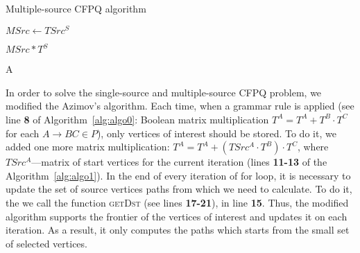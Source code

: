\begin{algorithm}
\small
\begin{algorithmic}[1]
\caption{Multiple-source CFPQ algorithm}
\label{alg:algo1}


     
    \EndFor
    
    \State $MSrc \gets TSrc^S$

     
        \EndFor
    \EndFor

     
        \EndFor
    \EndWhile
    \State \Return $MSrc * T^S$
\EndFunction



    \EndFor
    \State \Return A
\EndFunction
\end{algorithmic}
\end{algorithm}

In order to solve the single-source and multiple-source CFPQ problem, we modified the Azimov's algorithm.
Each time, when a grammar rule is applied (see line \textbf{8} of Algorithm~\ref{alg:algo0}: Boolean matrix multiplication $T^A = T^A + T^B \cdot T^C$ for each $A \rightarrow BC \in P$), only vertices of interest should be stored.
To do it, we added one more matrix multiplication: $T^A = T^A + (TSrc^A \cdot T^B) \cdot T^ C$, where $TSrc^A$---matrix of start vertices for the current iteration (lines \textbf{11-13} of the Algorithm~\ref{alg:algo1}).
In the end of every iteration of for loop, it is necessary to update the set of source vertices paths from which we need to calculate.
To do it, the we call the function \textsc{getDst} (see lines \textbf{17-21}), in line \textbf{15}.
Thus, the modified algorithm supports the frontier of the vertices of interest and updates it on each iteration.
As a result, it only computes the paths which starts from the small set of selected vertices.

